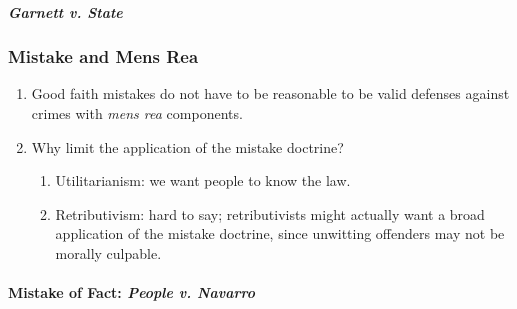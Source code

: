 \paragraph{\emph{Garnett v. State}}


\subsubsection{Mistake and Mens Rea}

\begin{enumerate}
    \item Good faith mistakes do not have to be reasonable to be valid defenses against crimes with \emph{mens rea} components.
    \item Why limit the application of the mistake doctrine?
    \begin{enumerate}
        \item Utilitarianism: we want people to know the law.
        \item Retributivism: hard to say; retributivists might actually want a broad application of the mistake doctrine, since unwitting offenders may not be morally culpable.
    \end{enumerate}
\end{enumerate}


\paragraph{Mistake of Fact: \emph{People v. Navarro}}

